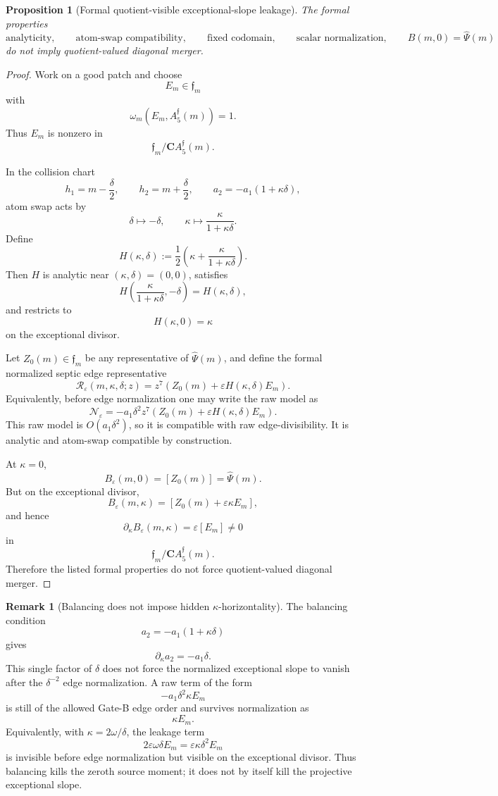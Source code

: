 \documentclass[11pt,a4paper]{amsart}
\theoremstyle{plain}
\newtheorem{proposition}[theorem]{Proposition}
\theoremstyle{definition}
\newtheorem{remark}[theorem]{Remark}
\begin{document}
\begin{proposition}[Formal quotient-visible exceptional-slope leakage]
\label{prop:formal-quotient-visible-exceptional-slope-leakage}
The formal properties
\[
\text{analyticity},\qquad
\text{atom-swap compatibility},\qquad
\text{fixed codomain},\qquad
\text{scalar normalization},\qquad
B(m,0)=\widehat\Psi(m)
\]
do not imply quotient-valued diagonal merger.
\end{proposition}

\begin{proof}
Work on a good patch and choose
\[
E_m\in\mathfrak f_m
\]
with
\[
\omega_m(E_m,A_5^{\mathfrak f}(m))=1.
\]
Thus \(E_m\) is nonzero in
\[
\mathfrak f_m/\mathbf C A_5^{\mathfrak f}(m).
\]

In the collision chart
\[
h_1=m-\frac{\delta}{2},
\qquad
h_2=m+\frac{\delta}{2},
\qquad
a_2=-a_1(1+\kappa\delta),
\]
atom swap acts by
\[
\delta\longmapsto-\delta,
\qquad
\kappa\longmapsto\frac{\kappa}{1+\kappa\delta}.
\]
Define
\[
H(\kappa,\delta)
:=
\frac12
\left(
\kappa+\frac{\kappa}{1+\kappa\delta}
\right).
\]
Then \(H\) is analytic near \((\kappa,\delta)=(0,0)\), satisfies
\[
H\!\left(\frac{\kappa}{1+\kappa\delta},-\delta\right)
=
H(\kappa,\delta),
\]
and restricts to
\[
H(\kappa,0)=\kappa
\]
on the exceptional divisor.

Let \(Z_0(m)\in\mathfrak f_m\) be any representative of
\(\widehat\Psi(m)\), and define the formal normalized septic edge
representative
\[
\mathcal R_\varepsilon(m,\kappa,\delta;z)
=
z^7
\left(
Z_0(m)+\varepsilon H(\kappa,\delta)E_m
\right).
\]
Equivalently, before edge normalization one may write the raw model as
\[
\mathcal N_\varepsilon
=
-a_1\delta^2z^7
\left(
Z_0(m)+\varepsilon H(\kappa,\delta)E_m
\right).
\]
This raw model is \(O(a_1\delta^2)\), so it is compatible with raw
edge-divisibility.  It is analytic and atom-swap compatible by construction.

At \(\kappa=0\),
\[
B_\varepsilon(m,0)=[Z_0(m)]=\widehat\Psi(m).
\]
But on the exceptional divisor,
\[
B_\varepsilon(m,\kappa)
=
[Z_0(m)+\varepsilon\kappa E_m],
\]
and hence
\[
\partial_\kappa B_\varepsilon(m,\kappa)
=
\varepsilon [E_m]\ne0
\]
in
\[
\mathfrak f_m/\mathbf C A_5^{\mathfrak f}(m).
\]
Therefore the listed formal properties do not force quotient-valued diagonal
merger.
\end{proof}

\begin{remark}[Balancing does not impose hidden \(\kappa\)-horizontality]
\label{rem:balancing-does-not-impose-kappa-horizontality}
The balancing condition
\[
a_2=-a_1(1+\kappa\delta)
\]
gives
\[
\partial_\kappa a_2=-a_1\delta.
\]
This single factor of \(\delta\) does not force the normalized exceptional
slope to vanish after the \(\delta^{-2}\) edge normalization.  A raw term of
the form
\[
-a_1\delta^2\kappa E_m
\]
is still of the allowed Gate-B edge order and survives normalization as
\[
\kappa E_m.
\]
Equivalently, with \(\kappa=2\omega/\delta\), the leakage term
\[
2\varepsilon\omega\delta E_m
=
\varepsilon\kappa\delta^2E_m
\]
is invisible before edge normalization but visible on the exceptional divisor.
Thus balancing kills the zeroth source moment; it does not by itself kill the
projective exceptional slope.
\end{remark}
\end{document}
